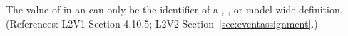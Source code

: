 The value of  in an \EventAssignment can only be the
identifier of a \Compartment, \Species, or model-wide \Parameter
definition.  (References: L2V1 Section 4.10.5; L2V2
Section~\ref{sec:eventassignment}.)

